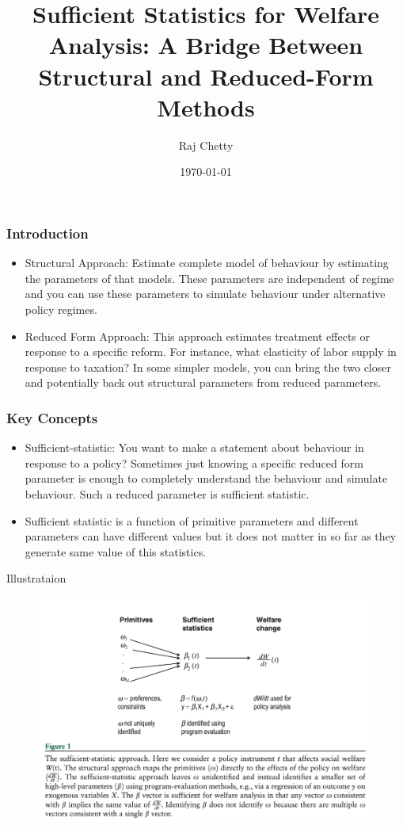 \documentclass{beamer}
\title{Sufficient Statistics for Welfare Analysis: A Bridge Between Structural and Reduced-Form Methods}
\author{Raj Chetty}
\date{\today}
\begin{document}
\frame{\titlepage}

\begin{frame}
\frametitle{Introduction}
\begin{itemize}
\item Structural Approach: Estimate complete model of behaviour by estimating the parameters of that models. These parameters are independent of regime and you can use these parameters to simulate behaviour under alternative policy regimes. 
\item Reduced Form Approach: This approach estimates treatment effects or response to a specific reform. For instance, what elasticity of labor supply in response to taxation? In some simpler models, you can bring the two closer and potentially back out structural parameters from reduced parameters. 

\end{itemize}
\end{frame}

\begin{frame}
\frametitle{Key Concepts}
\begin{itemize}
    \item Sufficient-statistic: You want to make a statement about behaviour in response to a policy? Sometimes just knowing a specific reduced form parameter is enough to completely understand the behaviour and simulate behaviour. Such a reduced parameter is sufficient statistic. 
    \item Sufficient statistic is a function of primitive parameters and different parameters can have different values but it does not matter in so far as they generate same value of this statistics.
\end{itemize}
\end{frame}

\begin{frame}{Illustrataion}
    \begin{figure}[h]
        \centering
        \includegraphics[width =\textwidth]{Paper Presentations/SufficientStatIlustration.png}
        \label{fig:enter-label}
    \end{figure}
\end{frame}
\end{document}
